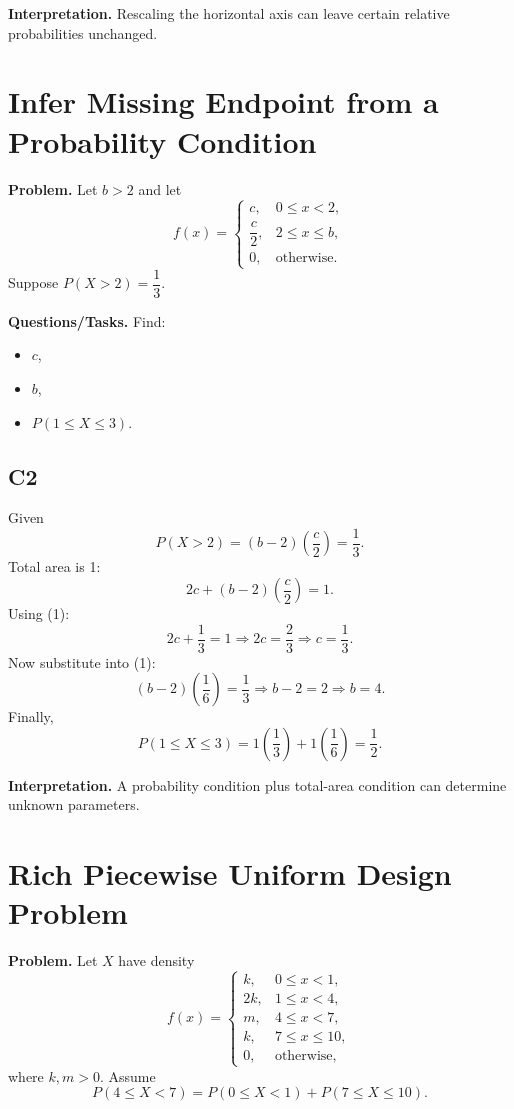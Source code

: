\textbf{Interpretation.}
Rescaling the horizontal axis can leave certain relative probabilities unchanged.

\section{Infer Missing Endpoint from a Probability Condition}

\textbf{Problem.}
Let $b>2$ and let
\[
f(x)=
\begin{cases}
c, & 0\le x<2,\\
\dfrac{c}{2}, & 2\le x\le b,\\
0, & \text{otherwise.}
\end{cases}
\]
Suppose $P(X>2)=\dfrac{1}{3}$.

\textbf{Questions/Tasks.}
Find:
\begin{itemize}
    \item[(a)] $c$,
    \item[(b)] $b$,
    \item[(c)] $P(1\le X\le 3)$.
\end{itemize}

\subsection*{C2}
Given
\[
P(X>2)=(b-2)\left(\frac{c}{2}\right)=\frac{1}{3}. \tag{1}
\]
Total area is 1:
\[
2c+(b-2)\left(\frac{c}{2}\right)=1.
\]
Using (1):
\[
2c+\frac{1}{3}=1 \Rightarrow 2c=\frac{2}{3} \Rightarrow c=\frac{1}{3}.
\]
Now substitute into (1):
\[
(b-2)\left(\frac{1}{6}\right)=\frac{1}{3}
\Rightarrow b-2=2
\Rightarrow b=4.
\]
Finally,
\[
P(1\le X\le 3)=1\left(\frac{1}{3}\right)+1\left(\frac{1}{6}\right)=\frac{1}{2}.
\]

\textbf{Interpretation.}
A probability condition plus total-area condition can determine unknown parameters.

\section{Rich Piecewise Uniform Design Problem}

\textbf{Problem.}
Let $X$ have density
\[
f(x)=
\begin{cases}
k, & 0\le x<1,\\
2k, & 1\le x<4,\\
m, & 4\le x<7,\\
k, & 7\le x\le 10,\\
0, & \text{otherwise,}
\end{cases}
\]
where $k,m>0$. Assume
\[
P(4\le X<7)=P(0\le X<1)+P(7\le X\le 10).
\]

